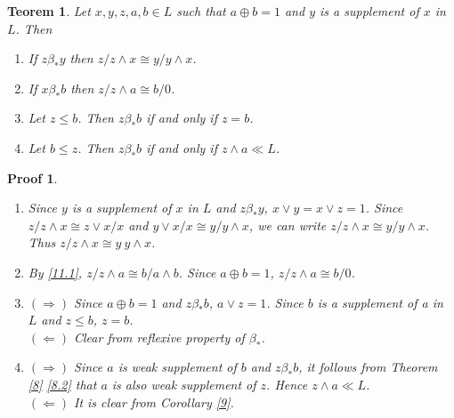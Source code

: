 \documentclass[a4paper,12pt]{article}
\numberwithin{equation}{section}
\theoremstyle{italik}
\newtheorem{teorem}{Teorem}[section]
\newtheorem*{ispat}{Proof}
\begin{document}
\begin{teorem}\label{11}
  Let $ x,y,z,a,b \in L $ such that $ a \oplus b = 1 $ and $ y $ is a supplement of $ x $ in $ L $. Then
  \begin{enumerate}[label=(\roman{*}), ref=(\roman{*})]
    \item
      If $ z \beta_* y $ then $ z / z \wedge x \cong y / y \wedge x $. \label{11.1}
    \item
      If $ x \beta_* b $ then $ z / z \wedge a \cong b / 0 $. \label{11.2}
    \item
      Let $ z \leq b $. Then $ z \beta_* b $ if and only if $ z = b $.\label{11.3}
    \item
      Let $ b \leq z $. Then $ z \beta_* b $ if and only if $ z \wedge a \ll L $.\label{11.4}
  \end{enumerate}
\end{teorem}
\begin{ispat}
  \begin{enumerate}
      \item
        Since $ y $ is a supplement of $ x $ in $ L $ and $ z \beta_* y $, 
        $ x \vee y = x \vee z = 1 $. Since $ z / z  \wedge x \cong z \vee x / x $ and 
        $ y \vee x / x \cong y / y \wedge x $, we can write $ z / z \wedge x \cong y / y \wedge x $. 
        Thus $ z / z \wedge x \cong y \ y \wedge x $.
      \item
        By \ref{11.1}, $ z / z \wedge a \cong b / a \wedge b $. Since $ a \oplus b = 1 $, 
        $ z / z \wedge a \cong b / 0 $.
      \item
        $ ( \Rightarrow ) $ 
        Since $ a \oplus b = 1 $ and $ z \beta_* b $, $ a \vee z = 1 $. Since $ b $ is a supplement of 
        a in $ L $ and $ z \leq b $, $ z = b $. \\
        $ ( \Leftarrow ) $ 
        Clear from reflexive property of $ \beta_* $.
      \item
        $ ( \Rightarrow ) $ 
        Since $ a $ is weak supplement of $ b $ and $ z \beta_* b $, it follows from 
        Theorem \ref{8} \ref{8.2} that $ a $ is also weak supplement of $ z $. Hence $ z \wedge a \ll L $. \\
        $ ( \Leftarrow ) $ 
        It is clear from Corollary \ref{9}.
    \end{enumerate}
\end{ispat}

\end{document}
